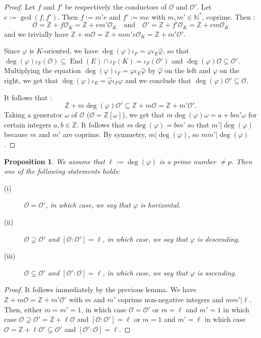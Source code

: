 \documentclass[a4paper,10pt]{report}
\theoremstyle{definition}
\theoremstyle{plain}
\newtheorem{Proposition}[Definition]{Proposition}
\theoremstyle{definition}
\newcommand{\N}{\mathbb{N}}
\newcommand{\Z}{\mathbb{Z}}
\newcommand{\mO}{\mathcal{O}}
\renewcommand{\(}{\left(}
\renewcommand{\)}{\right)}
\DeclareMathOperator{\End}{End}
\begin{document}
\begin{proof}
Let $f$ and $f'$ be respectively the conductors of $\mO$ and $\mO'$.  Let $e:=\gcd(f,f')$.  Then $f:=m'e$ and $f':=me$ with $m,m'\in\N^*$,  coprime.  Then :
\[\mO=\Z+f\mO_K=\Z+em'\mO_K \quad \mbox{and} \quad \mO'=\Z+f'\mO_K=\Z+em\mO_K\]
and we trivially have $\Z+m\mO=\Z+mm'e\mO_K=\Z+m'\mO'$.

Since $\varphi$ is $K$-oriented,  we have $\deg(\varphi)\iota_F=\varphi\iota_E\widehat{\varphi}$,  so that $\deg(\varphi)\iota_F(\mO)\subseteq \End(E)\cap\iota_F(K)=\iota_F(\mO')$ and $\deg(\varphi)\mO\subseteq \mO'$.  Multiplying the equation $\deg(\varphi)\iota_F=\varphi\iota_E\widehat{\varphi}$ by $\widehat{\varphi}$ on the left and $\varphi$ on the right, we get that $\deg(\varphi)\iota_E=\widehat{\varphi}\iota_F\varphi$ and we conclude that $\deg(\varphi)\mO'\subseteq \mO$. 

It follows that :
\[\Z+m\deg(\varphi)\mO'\subseteq \Z+m\mO= \Z+m'\mO'.\]
Taking a generator $\omega$ of $\mO$ ($\mO=\Z[\omega]$),  we get that $m\deg(\varphi)\omega=a+bm'\omega$ for certain integers $a,b\in\Z$.  It follows that $m\deg(\varphi)=bm'$ so that $m'|\deg(\varphi)$ because $m$ and $m'$ are coprime.  By symmetry,  $m|\deg(\varphi)$,  so $mm'|\deg(\varphi)$.
\end{proof}

\begin{Proposition}\label{Proposition 4}
We assume that $\ell:=\deg(\varphi)$ is a prime number $\neq p$.  Then one of the following statements holds:
\begin{description}
\item[(i)] $\mO=\mO'$,  in which case,  we say that $\varphi$ is \emph{horizontal}.
\item[(ii)] $\mO\supsetneq \mO'$ and $[\mO:\mO']=\ell$,  in which case,  we say that $\varphi$ is \emph{descending}. 
\item[(iii)] $\mO\subsetneq \mO'$ and $[\mO':\mO]=\ell$,  in which case,  we say that $\varphi$ is \emph{ascending}. 
\end{description}
\end{Proposition}

\begin{proof}
It follows immediately by the previous lemma.  We have $\Z+m\mO=\Z+m'\mO'$ with $m$ and $m'$ coprime non-negative integers and $mm'|\ell$.  Then,  either $m=m'=1$,  in which case $\mO=\mO'$ or $m=\ell$ and $m'=1$  in which case $\mO\supsetneq \mO'=\Z+\ell\mO$ and $[\mO:\mO']=\ell$ or $m=1$ and $m'=\ell$  in which case $\mO=\Z+\ell\mO'\subsetneq \mO'$ and $[\mO':\mO]=\ell$.
\end{proof}
\end{document}
